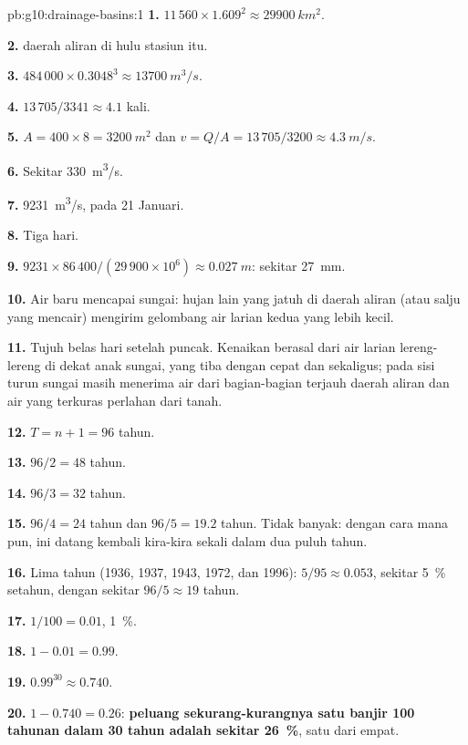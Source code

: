 \begin{solution}{pb:g10:drainage-basins:1}
\textbf{1.} $11\,560 \times 1.609^2 \approx \qty{29900}{km^2}$.

\textbf{2.}  daerah aliran di hulu stasiun itu.

\textbf{3.} $484\,000 \times 0.3048^3 \approx \qty{13700}{m^3/s}$.

\textbf{4.} $13\,705/3341 \approx 4.1$ kali.

\textbf{5.} $A = 400 \times 8 = \qty{3200}{m^2}$ dan $v = Q/A = 13\,705/3200
\approx \qty{4.3}{m/s}$.

\textbf{6.} Sekitar \qty{330}{m^3/s}.

\textbf{7.} \qty{9231}{m^3/s}, pada 21 Januari.

\textbf{8.} Tiga hari.

\textbf{9.} $9231 \times 86\,400/(29\,900 \times 10^6) \approx
\qty{0.027}{m}$: sekitar \qty{27}{mm}.

\textbf{10.} Air baru mencapai sungai: hujan lain yang jatuh di daerah aliran
(atau salju yang mencair) mengirim gelombang air larian kedua yang lebih
kecil.

\textbf{11.} Tujuh belas hari setelah puncak. Kenaikan berasal dari air larian
lereng-lereng di dekat anak sungai, yang tiba dengan cepat dan sekaligus; pada
sisi turun sungai masih menerima air dari bagian-bagian terjauh daerah aliran
dan air yang terkuras perlahan dari tanah.

\textbf{12.} $T = n + 1 = 96$ tahun.

\textbf{13.} $96/2 = 48$ tahun.

\textbf{14.} $96/3 = 32$ tahun.

\textbf{15.} $96/4 = 24$ tahun dan $96/5 = 19.2$ tahun. Tidak banyak: dengan
cara mana pun,  ini datang kembali kira-kira sekali dalam dua puluh tahun.

\textbf{16.} Lima tahun (1936, 1937, 1943, 1972, dan 1996): $5/95 \approx
0.053$, sekitar \qty{5}{\percent} setahun, dengan  sekitar
$96/5 \approx 19$ tahun.

\textbf{17.} $1/100 = 0.01$, \qty{1}{\percent}.

\textbf{18.} $1 - 0.01 = 0.99$.

\textbf{19.} $0.99^{30} \approx 0.740$.

\textbf{20.} $1 - 0.740 = 0.26$: \textbf{peluang sekurang-kurangnya satu banjir
100 tahunan dalam 30 tahun adalah sekitar \qty{26}{\percent}}, satu dari empat.
\end{solution}
